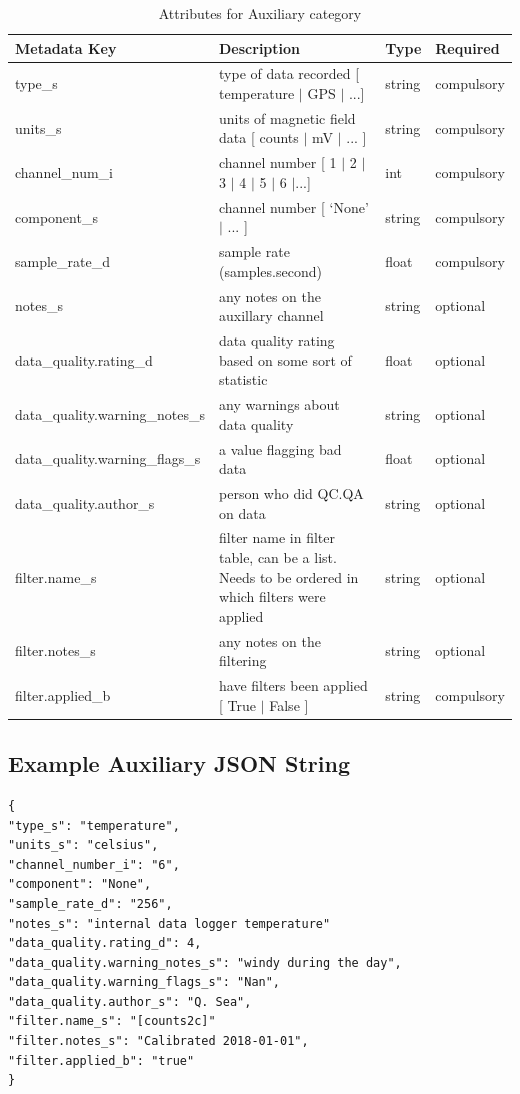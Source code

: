 \documentclass{article}
\begin{document}
\begin{table}[htb!]
	\caption[Attributes for Auxiliary Channel]{Attributes for Auxiliary category}
	\begin{tabular}{|l|p{3in}|l|l|}
		\hline
		\textbf{Metadata Key} & \textbf{Description} & \textbf{Type} & \textbf{Required} \\ \hline
		type\_s & type of data recorded [ temperature $|$ GPS $|$ ...] & string & compulsory \\ \hline
		units\_s & units of magnetic field data [ counts $|$ mV $|$ ... ] & string &  compulsory \\ \hline
		channel\_num\_i & channel number [ 1 $|$ 2 $|$ 3 $|$ 4 $|$ 5 $|$ 6 $|$...] & int &  compulsory \\ \hline
		component\_s & channel number [ `None' $|$ ... ] & string &  compulsory \\ \hline
		sample\_rate\_d & sample rate (samples.second) & float &  compulsory \\ \hline
		notes\_s & any notes on the auxillary channel & string &  optional \\ \hline
		data\_quality.rating\_d & data quality rating based on some sort of statistic & float &  optional \\ \hline
		data\_quality.warning\_notes\_s & any warnings about data quality & string &   optional \\ \hline
		data\_quality.warning\_flags\_s & a value flagging bad data  & float &  optional \\ \hline
		data\_quality.author\_s & person who did QC.QA on data & string &   optional \\ \hline
		filter.name\_s & filter name in filter table, can be a list. Needs to be ordered in which filters were applied & string &  optional \\ \hline
		filter.notes\_s & any notes on the filtering & string &  optional \\ \hline
		filter.applied\_b & have filters been applied [ True $|$ False ] & string & compulsory \\ \hline
	\end{tabular}
	\label{tab:aux}
\end{table}

\subsection{Example Auxiliary JSON String} 

\begin{verbatim}
{
"type_s": "temperature",
"units_s": "celsius",
"channel_number_i": "6",
"component": "None",
"sample_rate_d": "256",
"notes_s": "internal data logger temperature"
"data_quality.rating_d": 4,
"data_quality.warning_notes_s": "windy during the day",
"data_quality.warning_flags_s": "Nan",
"data_quality.author_s": "Q. Sea",
"filter.name_s": "[counts2c]"
"filter.notes_s": "Calibrated 2018-01-01",
"filter.applied_b": "true"
}
\end{verbatim}
\end{document}
